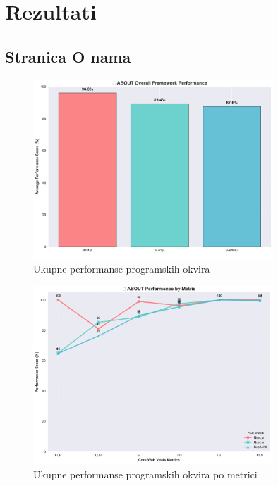 \section{Rezultati}

\subsection{Stranica O nama}

\begin{figure}[H]
    \centering
    \includegraphics[width=0.8\textwidth]{slike/rezultati/about/about_framework_overall_performance.png}
    \caption{Ukupne performanse programskih okvira}
    \label{fig:testiranje-o-nama-ukupne-performanse}
\end{figure}

\begin{figure}[H]
    \centering
    \includegraphics[width=0.8\textwidth]{slike/rezultati/about/about_performance_by_metric.png}
    \caption{Ukupne performanse programskih okvira po metrici}
    \label{fig:testiranje-o-nama-performanse-po-metrici}
\end{figure}

